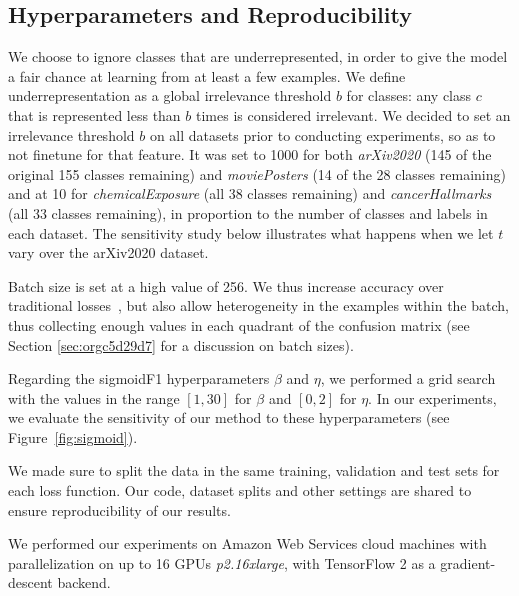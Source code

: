 \subsection{Hyperparameters and Reproducibility}
\label{subsec:hypers}

We choose to ignore classes that are underrepresented, in order to give the model a fair chance at learning from at least a few examples. We define underrepresentation as a global irrelevance threshold $b$ for classes: any class $c$ that is represented less than $b$ times is considered irrelevant. We decided to set an irrelevance threshold $b$ on all datasets prior to conducting experiments, so as to not finetune for that feature. It was set to 1000 for both \emph{arXiv2020} (145 of the original 155 classes remaining) and \emph{moviePosters} (14 of the 28 classes remaining) and at 10 for \emph{chemicalExposure} (all 38 classes remaining) and \emph{cancerHallmarks} (all 33 classes remaining), in proportion to the number of classes and labels in each dataset. The sensitivity study below illustrates what happens when we let $t$ vary over the arXiv2020 dataset.

Batch size is set at a high value of 256. We thus increase accuracy over traditional losses~\cite{bigBS}, but also allow heterogeneity in the examples within the batch, thus collecting enough values in each quadrant of the confusion matrix (see Section \ref{sec:orgc5d29d7} for a discussion on batch sizes).

Regarding the sigmoidF1 hyperparameters $\beta$ and $\eta$, we performed a grid search with the values in the range $[1,30]$ for $\beta$ and $[0, 2]$ for $\eta$.
In our experiments, we evaluate the sensitivity of our method to these hyperparameters (see Figure~\ref{fig:sigmoid}).

We made sure to split the data in the same training, validation and test sets for each loss function. Our code, dataset splits and other settings are shared to ensure reproducibility of our results. 

We performed our experiments on Amazon Web Services cloud machines with parallelization on up to 16 GPUs \textit{p2.16xlarge}, with TensorFlow 2 as a gradient-descent backend.
